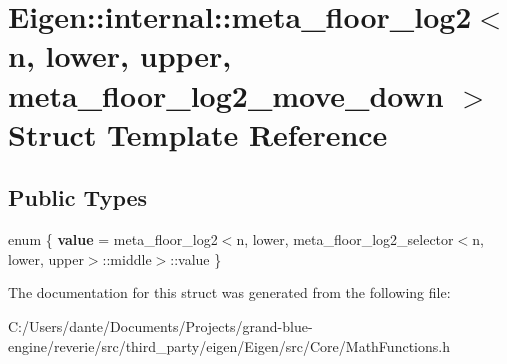 \hypertarget{struct_eigen_1_1internal_1_1meta__floor__log2_3_01n_00_01lower_00_01upper_00_01meta__floor__log2__move__down_01_4}{}\section{Eigen\+::internal\+::meta\+\_\+floor\+\_\+log2$<$ n, lower, upper, meta\+\_\+floor\+\_\+log2\+\_\+move\+\_\+down $>$ Struct Template Reference}
\label{struct_eigen_1_1internal_1_1meta__floor__log2_3_01n_00_01lower_00_01upper_00_01meta__floor__log2__move__down_01_4}
\subsection*{Public Types}
\begin{DoxyCompactItemize}
\item 
\mbox{\label{struct_eigen_1_1internal_1_1meta__floor__log2_3_01n_00_01lower_00_01upper_00_01meta__floor__log2__move__down_01_4_ae55c272eb334a11e95db0d5fc20b779c}} 
enum \{ {\bfseries value} = meta\+\_\+floor\+\_\+log2$<$n, lower, meta\+\_\+floor\+\_\+log2\+\_\+selector$<$n, lower, upper$>$\+::middle$>$\+::value
 \}
\end{DoxyCompactItemize}


The documentation for this struct was generated from the following file\+:\begin{DoxyCompactItemize}
\item 
C\+:/\+Users/dante/\+Documents/\+Projects/grand-\/blue-\/engine/reverie/src/third\+\_\+party/eigen/\+Eigen/src/\+Core/Math\+Functions.\+h\end{DoxyCompactItemize}
